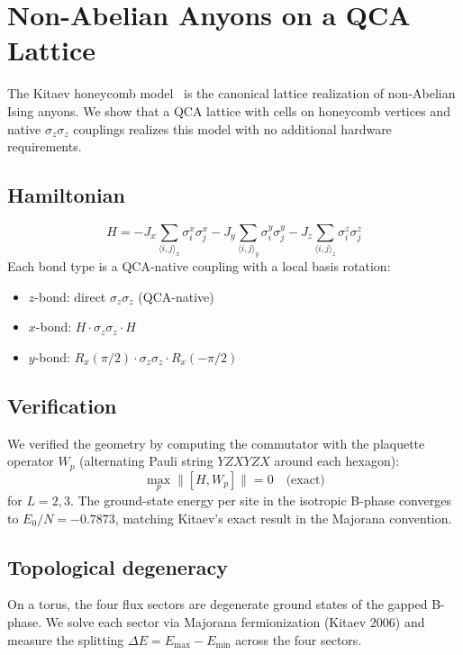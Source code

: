 \section{Non-Abelian Anyons on a QCA Lattice}
\label{sec:nonabelian}

The Kitaev honeycomb model~\cite{kitaev2006} is the canonical
lattice realization of non-Abelian Ising anyons.  We show that a
QCA lattice with cells on honeycomb vertices and native
$\sigma_z \sigma_z$ couplings realizes this model with no
additional hardware requirements.

\subsection{Hamiltonian}
\begin{equation}
H = -J_x \sum_{\langle i,j\rangle_x} \sigma^x_i \sigma^x_j
    -J_y \sum_{\langle i,j\rangle_y} \sigma^y_i \sigma^y_j
    -J_z \sum_{\langle i,j\rangle_z} \sigma^z_i \sigma^z_j
\end{equation}
Each bond type is a QCA-native coupling with a local basis
rotation:
\begin{itemize}
\item $z$-bond: direct $\sigma_z \sigma_z$ (QCA-native)
\item $x$-bond: $H \cdot \sigma_z \sigma_z \cdot H$
\item $y$-bond: $R_x(\pi/2) \cdot \sigma_z \sigma_z \cdot
      R_x(-\pi/2)$
\end{itemize}

\subsection{Verification}

We verified the geometry by computing the commutator with the
plaquette operator $W_p$ (alternating Pauli string
$Y Z X Y Z X$ around each hexagon):
\begin{equation}
\max_{p} \|[H, W_p]\| = 0 \quad \text{(exact)}
\end{equation}
for $L = 2, 3$.  The ground-state energy per site in the
isotropic B-phase converges to $E_0/N = -0.7873$, matching
Kitaev's exact result in the Majorana convention.

\subsection{Topological degeneracy}

On a torus, the four flux sectors are degenerate ground states
of the gapped B-phase.  We solve each sector via Majorana
fermionization (Kitaev 2006) and measure the splitting
$\Delta E = E_{\max} - E_{\min}$ across the four sectors.

